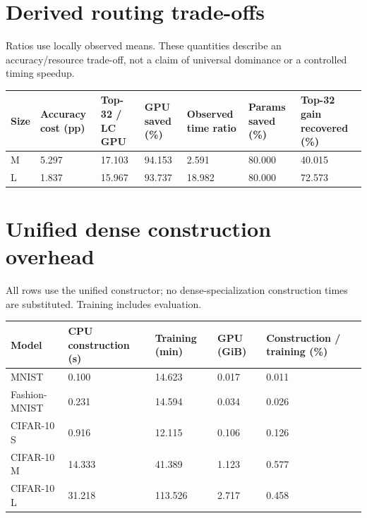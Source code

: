 \documentclass[10pt,a4paper]{article}
\begin{document}
\section*{Derived routing trade-offs}
Ratios use locally observed means. These quantities describe an accuracy/resource trade-off, not a claim of universal dominance or a controlled timing speedup.
\par\bigskip
\setlength{\tabcolsep}{2pt}
\begin{tabular}{@{}p{29mm}p{35.0mm}p{35.0mm}p{35.0mm}p{35.0mm}p{35.0mm}p{35.0mm}@{}}
\toprule
Size & Accuracy cost (pp) & Top-32 / LC GPU & GPU saved (\%) & Observed time ratio & Params saved (\%) & Top-32 gain recovered (\%) \\ \midrule
M & 5.297 & 17.103 & 94.153 & 2.591 & 80.000 & 40.015 \\
L & 1.837 & 15.967 & 93.737 & 18.982 & 80.000 & 72.573 \\
\bottomrule
\end{tabular}
\clearpage
\section*{Unified dense construction overhead}
All rows use the unified constructor; no dense-specialization construction times are substituted. Training includes evaluation.
\par\bigskip
\setlength{\tabcolsep}{2pt}
\begin{tabular}{@{}p{57mm}p{47.0mm}p{47.0mm}p{47.0mm}p{47.0mm}@{}}
\toprule
Model & CPU construction (s) & Training (min) & GPU (GiB) & Construction / training (\%) \\ \midrule
MNIST & 0.100 & 14.623 & 0.017 & 0.011 \\
Fashion-MNIST & 0.231 & 14.594 & 0.034 & 0.026 \\
CIFAR-10 S & 0.916 & 12.115 & 0.106 & 0.126 \\
CIFAR-10 M & 14.333 & 41.389 & 1.123 & 0.577 \\
CIFAR-10 L & 31.218 & 113.526 & 2.717 & 0.458 \\
\bottomrule
\end{tabular}
\clearpage
\end{document}

